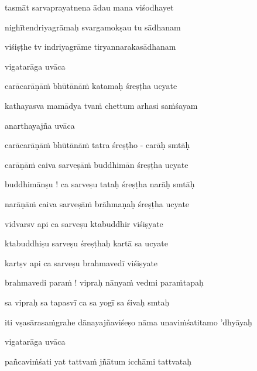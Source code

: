 tasmāt sarvaprayatnena ādau mana viśodhayet \veg\dontdisplaylinenum

nighītendriyagrāmaḥ svargamokṣau tu sādhanam\thinspace{\dandab} \dontdisplaylinenum

viśiṣṭhe tv indriyagrāme tiryannarakasādhanam \veg\dontdisplaylinenum

vigatarāga uvāca~{\dandab}\dontdisplaylinenum 

carācarāṇā\.m bhūtānā\.m katamaḥ śreṣṭha ucyate\thinspace{\danda} \dontdisplaylinenum

kathayasva mamādya tva\.m chettum arhasi sa\.mśayam \veg\dontdisplaylinenum

anarthayajña uvāca~{\dandab}\dontdisplaylinenum 

carācarāṇā\.m bhūtānā\.m tatra śreṣṭho - carāḥ smtāḥ\thinspace{\danda} \dontdisplaylinenum

carāṇā\.m caiva sarveṣā\.m buddhimān śreṣṭha ucyate \veg\dontdisplaylinenum

buddhimānṣu ! ca sarveṣu tataḥ śreṣṭha narāḥ smtāḥ\thinspace{\dandab} \dontdisplaylinenum

narāṇā\.m caiva sarveṣā\.m brāhmaṇaḥ śreṣṭha ucyate \veg\dontdisplaylinenum

vidvarsv api ca sarveṣu ktabuddhir viśiṣyate\thinspace{\dandab} \dontdisplaylinenum

ktabuddhiṣu sarveṣu śreṣṭhaḥ kartā sa ucyate \veg\dontdisplaylinenum

kartṣv api ca sarveṣu brahmavedī viśiṣyate\thinspace{\dandab} \dontdisplaylinenum

brahmavedi para\.m ! vipraḥ nānya\.m vedmi para\.mtapaḥ \danda\dontdisplaylinenum

sa vipraḥ sa tapasvī ca sa yogī sa śivaḥ smtaḥ \veg\dontdisplaylinenum


\jump
\begin{center}
\ketdanda iti vṣasārasa\.mgrahe dānayajñaviśeṣo nāma unavi\.mśatitamo 'dhyāyaḥ\ketdanda
\end{center}
\dontdisplaylinenum\vers 
\bekveg\szamveg\vfill\phpspagebreak\szam\bek{}
\thispagestyle{empty}



\jump\jump
\vers

vigatarāga uvāca~{\dandab}\dontdisplaylinenum 

pañcavi\.mśati yat tattva\.m jñātum icchāmi tattvataḥ\thinspace{\danda} \dontdisplaylinenum

